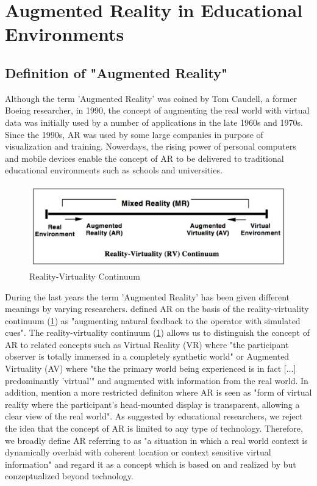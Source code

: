 \section{Augmented Reality in Educational Environments}

\subsection{Definition of "Augmented Reality"}
Although the term 'Augmented Reality' was coined by Tom Caudell, a former Boeing researcher, in 1990, the concept of augmenting the real world with virtual data was initially used by a number of applications in the late 1960s and 1970s. Since the 1990s, AR was used by some large companies in purpose of visualization and training. Nowerdays, the rising power of personal computers and mobile devices enable the concept of AR to be delivered to traditional educational environments such as schools and universities. \autocite [cf.][21]{Johnson.2010} 
\begin{figure}[ptbh]
    \centering
    \includegraphics[width=\linewidth]{figures/rvc.png}
    \caption[Reality-Virtuality Continuum]{Reality-Virtuality Continuum}
    \label{fig:RealityVirtualityContinuum}
\end{figure}

During the last years the term 'Augmented Reality' has been given different meanings by varying researchers. \autocite [cf.][42]{Wu.2013} \cite{Milgram.1994b} defined AR on the basis of the reality-virtuality continuum (\ref{fig:RealityVirtualityContinuum}) as "augmenting natural feedback to the operator with simulated cues". \autocite[283]{Milgram.1994b} The reality-virtuality continuum (\ref{fig:RealityVirtualityContinuum}) allows us to distinguish the concept of AR to related concepts such as Virtual Reality (VR) where "the participant observer is totally immersed in a completely synthetic world" \autocite[283]{Milgram.1994b} or Augmented Virtuality (AV) where "the the primary world being experienced is in fact [...] predominantly 'virtual'"\autocite[4]{Milgram.1994} and augmented with information from the real world. In addition, \cite{Milgram.1994b} mention a more restricted definiton where AR is seen as "form of virtual reality where the participant's head-mounted display is transparent, allowing a clear view of the real world". \autocite[283]{Milgram.1994b} As suggested by educational researchers,\autocite[cf.][42]{Wu.2013} we reject the idea that the concept of AR is limited to any type of technology. Therefore, we broadly define AR referring to \cite{Klopfer.2008} as "a situation in which a real world context is dynamically overlaid with coherent location or context sensitive virtual information"\autocite[205]{Klopfer.2008} and regard it as a concept which is based on and realized by but conzeptualized beyond technology.

